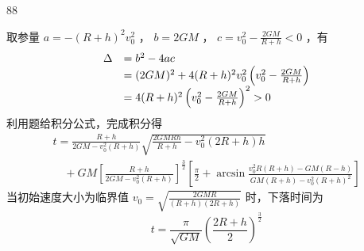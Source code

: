 \begin{solution}{88}
\begin{subsolution}
\begin{equation}
\label{eq:25.s88}
\end{equation}
取参量 $a = -\left(R + h\right)^2 v_0^2$ ， $b = 2GM$ ， $c = v_0^2 -\frac{2GM}{R + h} < 0$ ，有
\begin{equation}
\begin{array}{r l} \Delta & = b ^ {2} - 4 a c \\ & = (2 G M) ^ {2} + 4 (R + h) ^ {2} v _ {0} ^ {2} \left(v _ {0} ^ {2} - \frac {2 G M}{R + h}\right) \\ & = 4 (R + h) ^ {2} \left(v _ {0} ^ {2} - \frac {2 G M}{R + h}\right) ^ {2} > 0 \end{array}
\label{eq:26.s88}
\end{equation}
利用题给积分公式，完成积分得
\begin{equation}
\begin{array}{l} t = \frac {R + h}{2 G M - v _ {0} ^ {2} (R + h)} \sqrt {\frac {2 G M R h}{R + h} - v _ {0} ^ {2} (2 R + h) h} \\ \quad + G M \left[ \frac {R + h}{2 G M - v _ {0} ^ {2} (R + h)} \right] ^ {\frac {3}{2}} \left[ \frac {\pi}{2} + \arcsin \frac {v _ {0} ^ {2} R (R + h) - G M (R - h)}{G M (R + h) - v _ {0} ^ {2} (R + h) ^ {2}} \right] \end{array}
\label{eq:27.s88}
\end{equation}
当初始速度大小为临界值 $v_{0}=\sqrt{\frac{2GMR}{(R+h)(2R+h)}}$ 时，下落时间为
\begin{equation}
t = \frac {\pi}{\sqrt {G M}} \left(\frac {2 R + h}{2}\right) ^ {\frac {3}{2}}
\label{eq:28.s88}
\end{equation}
\end{subsolution}
\end{solution}